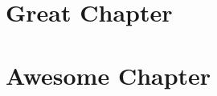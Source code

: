 \documentclass[12pt,openright,twoside]{book}
\title{\booktitle}
\author{\authorname}
\begin{document}

\frontmatter


\tableofcontents



\mainmatter
\pagestyle{fancy}

\chapter{Great Chapter}


\chapter{Awesome Chapter}


\backmatter

\end{document}
